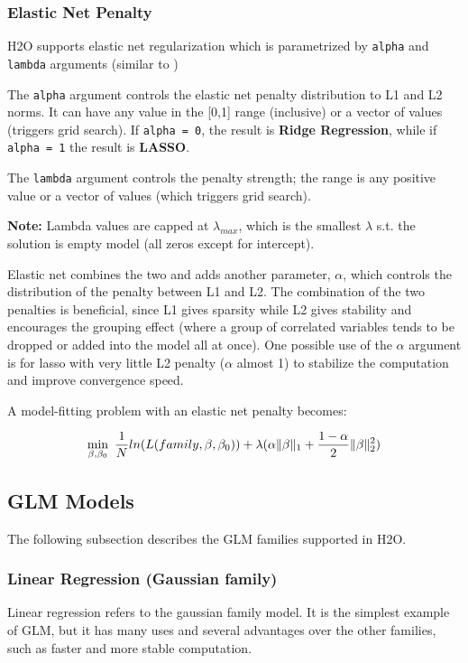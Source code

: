 \documentclass[11pt]{article}
\begin{document}
\subsubsection{Elastic Net Penalty}

H2O supports elastic net regularization which is parametrized by \texttt{alpha} and \texttt{lambda} arguments (similar to )

The \texttt{alpha} argument controls the elastic net penalty distribution to L1 and L2 norms. It can have any value in the [0,1] range (inclusive) or a vector of values (triggers grid search). If \texttt{alpha = 0}, the result is \textbf{Ridge Regression}, while if \texttt{alpha = 1} the result is \textbf{LASSO}.  

The \texttt{lambda} argument controls the penalty strength; the range is any positive value or a vector of values (which triggers grid search).

\textbf{Note:} Lambda values are capped at $\lambda_{max}$, which is the smallest $\lambda$ s.t. the solution is empty model (all zeros except for intercept).

Elastic net combines the two and adds another parameter, $\alpha$, which controls the distribution of the penalty between L1 and L2. The combination of the two penalties is beneficial, since L1 gives sparsity while L2 gives stability and encourages the grouping effect (where a group of correlated variables tends to be dropped or added into the model all at once). One possible use of the $\alpha$ argument is for lasso with very little L2 penalty ($\alpha$ almost 1) to stabilize the computation and improve convergence speed. 

A model-fitting problem with an elastic net penalty becomes:

\[ \min\limits_{\beta,\beta_0}\ {{1\over{N}} ln(L(family,\beta,\beta_0))  + \lambda (\alpha \| \beta \|_1}  + {1- \alpha \over 2} \| \beta \|_2^2) \]


\subsection{GLM Models} 
The following subsection describes the GLM families supported in H2O. 

\subsubsection{Linear Regression (Gaussian family) }
Linear regression refers to the gaussian family model. It is the simplest example of GLM, but it has many uses and several advantages over the other families, such as faster and more stable computation. 
\end{document}
